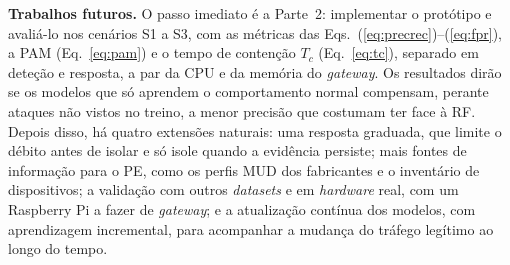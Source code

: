 \documentclass[conference,a4paper]{IEEEtran}
\begin{document}
\textbf{Trabalhos futuros.} O passo imediato é a Parte~2: implementar o protótipo e
avaliá-lo nos cenários S1 a S3, com as métricas das
Eqs.~(\ref{eq:precrec})--(\ref{eq:fpr}), a PAM (Eq.~\ref{eq:pam}) e o tempo de contenção
$T_c$ (Eq.~\ref{eq:tc}), separado em deteção e resposta, a par da CPU e da memória do
\textit{gateway}. Os resultados dirão se os modelos que só aprendem o comportamento
normal compensam, perante ataques não vistos no treino, a menor precisão que costumam ter
face à RF. Depois disso, há quatro extensões naturais: uma resposta graduada, que limite
o débito antes de isolar e só isole quando a evidência persiste; mais fontes de
informação para o PE, como os perfis MUD dos fabricantes e o inventário de dispositivos;
a validação com outros \textit{datasets} e em \textit{hardware} real, com um Raspberry Pi
a fazer de \textit{gateway}; e a atualização contínua dos modelos, com aprendizagem
incremental, para acompanhar a mudança do tráfego legítimo ao longo do tempo.



\end{document}
